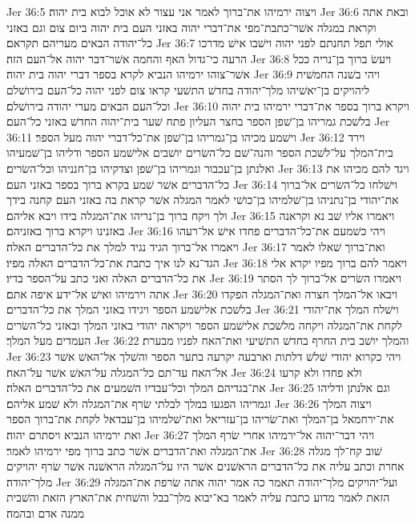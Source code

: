 Jer 36:5  ויצוה ירמיהו את־ברוך לאמר אני עצור לא אוכל לבוא בית יהוה׃
Jer 36:6  ובאת אתה וקראת במגלה אשׁר־כתבת־מפי את־דברי יהוה באזני העם בית יהוה ביום צום וגם באזני כל־יהודה הבאים מעריהם תקראם׃
Jer 36:7  אולי תפל תחנתם לפני יהוה וישׁבו אישׁ מדרכו הרעה כי־גדול האף והחמה אשׁר־דבר יהוה אל־העם הזה׃
Jer 36:8  ויעשׂ ברוך בן־נריה ככל אשׁר־צוהו ירמיהו הנביא לקרא בספר דברי יהוה בית יהוה׃
Jer 36:9  ויהי בשׁנה החמשׁית ליהויקים בן־יאשׁיהו מלך־יהודה בחדשׁ התשׁעי קראו צום לפני יהוה כל־העם בירושׁלם וכל־העם הבאים מערי יהודה בירושׁלם׃
Jer 36:10  ויקרא ברוך בספר את־דברי ירמיהו בית יהוה בלשׁכת גמריהו בן־שׁפן הספר בחצר העליון פתח שׁער בית־יהוה החדשׁ באזני כל־העם׃
Jer 36:11  וישׁמע מכיהו בן־גמריהו בן־שׁפן את־כל־דברי יהוה מעל הספר׃
Jer 36:12  וירד בית־המלך על־לשׁכת הספר והנה־שׁם כל־השׂרים יושׁבים אלישׁמע הספר ודליהו בן־שׁמעיהו ואלנתן בן־עכבור וגמריהו בן־שׁפן וצדקיהו בן־חנניהו וכל־השׂרים׃
Jer 36:13  ויגד להם מכיהו את כל־הדברים אשׁר שׁמע בקרא ברוך בספר באזני העם׃
Jer 36:14  וישׁלחו כל־השׂרים אל־ברוך את־יהודי בן־נתניהו בן־שׁלמיהו בן־כושׁי לאמר המגלה אשׁר קראת בה באזני העם קחנה בידך ולך ויקח ברוך בן־נריהו את־המגלה בידו ויבא אליהם׃
Jer 36:15  ויאמרו אליו שׁב נא וקראנה באזנינו ויקרא ברוך באזניהם׃
Jer 36:16  ויהי כשׁמעם את־כל־הדברים פחדו אישׁ אל־רעהו ויאמרו אל־ברוך הגיד נגיד למלך את כל־הדברים האלה׃
Jer 36:17  ואת־ברוך שׁאלו לאמר הגד־נא לנו איך כתבת את־כל־הדברים האלה מפיו׃
Jer 36:18  ויאמר להם ברוך מפיו יקרא אלי את כל־הדברים האלה ואני כתב על־הספר בדיו׃
Jer 36:19  ויאמרו השׂרים אל־ברוך לך הסתר אתה וירמיהו ואישׁ אל־ידע איפה אתם׃
Jer 36:20  ויבאו אל־המלך חצרה ואת־המגלה הפקדו בלשׁכת אלישׁמע הספר ויגידו באזני המלך את כל־הדברים׃
Jer 36:21  וישׁלח המלך את־יהודי לקחת את־המגלה ויקחה מלשׁכת אלישׁמע הספר ויקראה יהודי באזני המלך ובאזני כל־השׂרים העמדים מעל המלך׃
Jer 36:22  והמלך יושׁב בית החרף בחדשׁ התשׁיעי ואת־האח לפניו מבערת׃
Jer 36:23  ויהי כקרוא יהודי שׁלשׁ דלתות וארבעה יקרעה בתער הספר והשׁלך אל־האשׁ אשׁר אל־האח עד־תם כל־המגלה על־האשׁ אשׁר על־האח׃
Jer 36:24  ולא פחדו ולא קרעו את־בגדיהם המלך וכל־עבדיו השׁמעים את כל־הדברים האלה׃
Jer 36:25  וגם אלנתן ודליהו וגמריהו הפגעו במלך לבלתי שׂרף את־המגלה ולא שׁמע אליהם׃
Jer 36:26  ויצוה המלך את־ירחמאל בן־המלך ואת־שׂריהו בן־עזריאל ואת־שׁלמיהו בן־עבדאל לקחת את־ברוך הספר ואת ירמיהו הנביא ויסתרם יהוה׃
Jer 36:27  ויהי דבר־יהוה אל־ירמיהו אחרי שׂרף המלך את־המגלה ואת־הדברים אשׁר כתב ברוך מפי ירמיהו לאמר׃
Jer 36:28  שׁוב קח־לך מגלה אחרת וכתב עליה את כל־הדברים הראשׁנים אשׁר היו על־המגלה הראשׁנה אשׁר שׂרף יהויקים מלך־יהודה׃
Jer 36:29  ועל־יהויקים מלך־יהודה תאמר כה אמר יהוה אתה שׂרפת את־המגלה הזאת לאמר מדוע כתבת עליה לאמר בא־יבוא מלך־בבל והשׁחית את־הארץ הזאת והשׁבית ממנה אדם ובהמה׃
